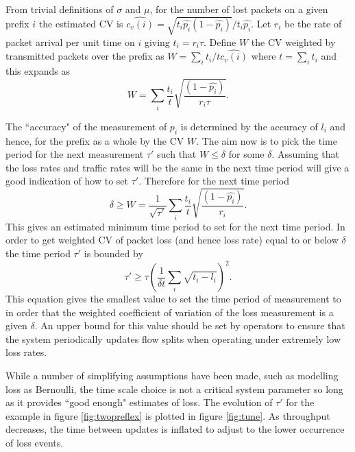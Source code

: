 From trivial definitions of $\sigma$ and $\mu$, for the number of lost packets on a given prefix $i$ the estimated \ac{CV} is $\hat{c_v(i)} = \sqrt{t_i \hat{p_i}(1- \hat{p_i})}/t_i\hat{p_i}$.
Let $r_i$ be the rate of packet arrival per unit time on $i$ giving $t_i= r_i \tau$.  
Define $W$ the \ac{CV} weighted by transmitted packets over the prefix as $W= \sum_i t_i/t \hat{c_v(i)}$ where $t= \sum_i t_i$ and this expands as $$W =  \sum_i \frac{t_i}{t} \sqrt{\frac{ (1- \hat{p_i})} {r_i \tau }}.$$

The ``accuracy" of the measurement of $p_i$ is determined by the accuracy of $l_i$ and hence, for the prefix as a whole by the \ac{CV} $W$.
The aim now is to pick the time period for the next measurement $\tau'$ such that $W \leq \delta$ for some $\delta$.  
Assuming that the loss rates and traffic rates will be the same in the next time period will give a good indication of how to set $\tau'$.  
Therefore for the next time period $$\delta \geq W = \frac{1}{\sqrt{\tau'}}\sum_i \frac{t_i}{t} \sqrt{\frac{(1- \hat{p_i})} {r_i }}.$$
This gives an estimated minimum time period to set for the next time period. 
In order to get weighted \ac{CV} of packet loss (and hence loss rate) equal to or below $\delta$ the time period $\tau'$ is bounded by
$$
\tau' \geq \tau \left( \frac{1}{\delta t}\sum_i
\sqrt{t_i- l_i} \right)^2.
$$
This equation gives the smallest value to set the time period of measurement to in order that the weighted coefficient of variation of the loss measurement is a given $\delta$. An upper bound for this value should be set by operators to ensure that the system periodically updates flow splits when operating under extremely low loss rates.
    
While a number of simplifying assumptions have been made, such as modelling loss as Bernoulli, the time scale choice is not a critical system parameter so long as it provides ``good enough" estimates of loss. 
The evolution of $\tau'$ for the example in figure \ref{fig:twopreflex} is plotted in figure \ref{fig:tune}. 
As throughput decreases, the time between updates is inflated to adjust to the lower occurrence of loss events. 
